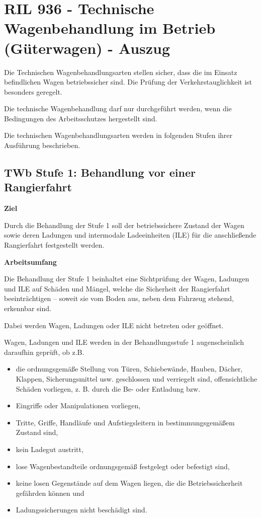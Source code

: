 \section{RIL 936 - Technische Wagenbehandlung im Betrieb (Güterwagen) - Auszug}
Die Technischen Wagenbehandlungsarten stellen sicher,
dass die im Einsatz befindlichen Wagen betriebssicher
sind. Die Prüfung der Verkehrstauglichkeit ist besonders
geregelt.\par 
Die technische Wagenbehandlung darf nur durchgeführt
werden, wenn die Bedingungen des Arbeitsschutzes hergestellt
sind.\par
Die technischen Wagenbehandlungsarten werden in folgenden
Stufen ihrer Ausführung beschrieben.
\subsection{TWb Stufe 1: Behandlung vor einer Rangierfahrt}
\textbf{Ziel}\par
Durch die Behandlung der Stufe 1 soll der betriebssichere
Zustand der Wagen sowie deren Ladungen und intermodale
Ladeeinheiten (ILE) für die anschließende Rangierfahrt
festgestellt werden.\par
\textbf{Arbeitsumfang}\par
Die Behandlung der Stufe 1 beinhaltet eine Sichtprüfung
der Wagen, Ladungen und ILE auf Schäden und Mängel,
welche die Sicherheit der Rangierfahrt beeinträchtigen –
soweit sie vom Boden aus, neben dem Fahrzeug stehend,
erkennbar sind.\par
Dabei werden Wagen, Ladungen oder ILE nicht betreten
oder geöffnet.\par
Wagen, Ladungen und ILE werden in der Behandlungsstufe
1 augenscheinlich daraufhin geprüft, ob z.B.
\begin{itemize}
    \item die ordnungsgemäße Stellung von Türen, Schiebewände, Hauben, Dächer, Klappen, Sicherungsmittel usw. geschlossen und verriegelt sind, offensichtliche Schäden vorliegen, z. B. durch die Be- oder Entladung bzw.
    \item Eingriffe oder Manipulationen vorliegen,
    \item Tritte, Griffe, Handläufe und Aufstiegsleitern in bestimmungsgemäßem Zustand sind,
    \item kein Ladegut austritt,
    \item lose Wagenbestandteile ordnungsgemäß festgelegt oder befestigt sind,
    \item keine losen Gegenstände auf dem Wagen liegen, die die Betriebssicherheit gefährden können und
    \item Ladungssicherungen nicht beschädigt sind.
\end{itemize}
